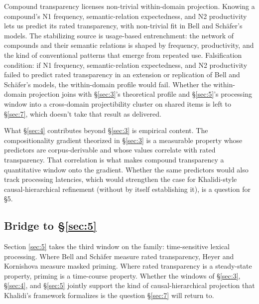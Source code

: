 Compound transparency licenses non-trivial within-domain projection. Knowing a compound's \textup{N1} frequency, semantic-relation expectedness, and \textup{N2} productivity lets us predict its rated transparency, with non-trivial fit in Bell and Schäfer's models. The stabilizing source is usage-based entrenchment: the network of compounds and their semantic relations is shaped by frequency, productivity, and the kind of conventional patterns that emerge from repeated use. Falsification condition: if \textup{N1} frequency, semantic-relation expectedness, and \textup{N2} productivity failed to predict rated transparency in an extension or replication of Bell and Schäfer's models, the within-domain profile would fail. Whether the within-domain projection joins with §\ref{sec:3}'s theoretical profile and §\ref{sec:5}'s processing window into a cross-domain projectibility cluster on shared items is left to §\ref{sec:7}, which doesn't take that result as delivered.

What §\ref{sec:4} contributes beyond §\ref{sec:3} is empirical content. The compositionality gradient theorized in §\ref{sec:3} is a measurable property whose predictors are corpus-derivable and whose values correlate with rated transparency. That correlation is what makes compound transparency a quantitative window onto the gradient. Whether the same predictors would also track processing latencies, which would strengthen the case for Khalidi-style causal-hierarchical refinement (without by itself establishing it), is a question for §5.

\subsection{Bridge to §\ref{sec:5}}

Section \ref{sec:5} takes the third window on the family: time-sensitive lexical processing. Where Bell and Schäfer measure rated transparency, Heyer and Kornishova measure masked priming. Where rated transparency is a steady-state property, priming is a time-course property. Whether the windows of §\ref{sec:3}, §\ref{sec:4}, and §\ref{sec:5} jointly support the kind of causal-hierarchical projection that Khalidi's framework formalizes is the question §\ref{sec:7} will return to.
